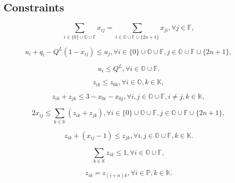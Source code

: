 \documentclass[11pt]{ctexart}
\begin{document}
\subsection{Constraints}
\begin{equation}
    \label{eq:5}
    \sum_{i \in \{0\} \cup \mathbb{O} \cup \mathbb{F}} x_{ij} = \sum_{i \in \mathbb{O} \cup \mathbb{F} \cup \{2n+1\}} x_{ji}, \forall j \in \mathbb{F}, \tag{5}
\end{equation}

\begin{equation}
    \label{eq:6}
    u_i + q_i - Q^L(1 - x_{ij}) \le u_j, \forall i \in \{0\} \cup \mathbb{O} \cup \mathbb{F}, j \in \mathbb{O} \cup \mathbb{F} \cup \{2n+1\}, \tag{6}
\end{equation}

\begin{equation}
    \label{eq:7}
    u_i \le Q^L, \forall i \in \mathbb{O} \cup \mathbb{F}. \tag{7}
\end{equation}

\begin{equation}
    \label{eq:8}
    z_{ik} \le z_{0k}, \forall i \in \mathbb{O}, k \in \mathbb{K}, \tag{8}
\end{equation}

\begin{equation}
    \label{eq:9}
    z_{ik} + z_{jk} \le 3 - x_{0i} - x_{0j}, \forall i, j \in \mathbb{O} \cup \mathbb{F}, i\ne j, k \in \mathbb{K}, \tag{9}
\end{equation}

\begin{equation}
    \label{eq:10}
    2x_{ij} \le \sum_{k \in \mathbb{K}} (z_{ik} + z_{jk}), \forall i \in \{0\} \cup \mathbb{O} \cup \mathbb{F}, j \in \mathbb{O} \cup \mathbb{F} \cup \{2n + 1\}, \tag{10}
\end{equation}

\begin{equation}
    \label{eq:11}
    z_{ik} + (x_{ij} - 1) \le z_{jk}, \forall i, j \in \mathbb{O} \cup \mathbb{F}, k \in \mathbb{K}. \tag{11}
\end{equation}

\begin{equation}
    \label{eq:12}
    \sum_{k \in \mathbb{K}} z_{ik} \le 1, \forall i \in \mathbb{O} \cup \mathbb{F}, \tag{12}
\end{equation}

\begin{equation}
    \label{eq:13}
    z_{ik} = z_{(i+n)k}, \forall i \in \mathbb{P}, k \in \mathbb{K}. \tag{13}
\end{equation}
\end{document}
